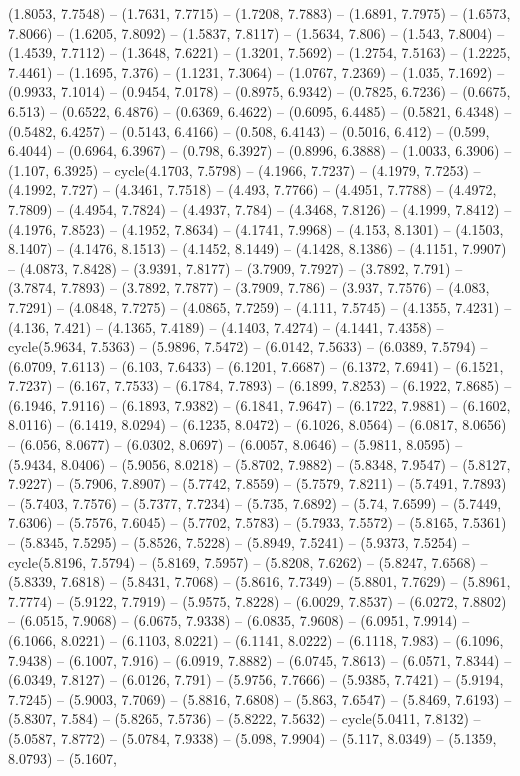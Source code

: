 (1.8053, 7.7548) -- (1.7631, 7.7715) -- (1.7208, 7.7883) -- (1.6891, 7.7975) -- (1.6573, 7.8066) -- (1.6205, 7.8092) -- (1.5837, 7.8117) -- (1.5634, 7.806) -- (1.543, 7.8004) -- (1.4539, 7.7112) -- (1.3648, 7.6221) -- (1.3201, 7.5692) -- (1.2754, 7.5163) -- (1.2225, 7.4461) -- (1.1695, 7.376) -- (1.1231, 7.3064) -- (1.0767, 7.2369) -- (1.035, 7.1692) -- (0.9933, 7.1014) -- (0.9454, 7.0178) -- (0.8975, 6.9342) -- (0.7825, 6.7236) -- (0.6675, 6.513) -- (0.6522, 6.4876) -- (0.6369, 6.4622) -- (0.6095, 6.4485) -- (0.5821, 6.4348) -- (0.5482, 6.4257) -- (0.5143, 6.4166) -- (0.508, 6.4143) -- (0.5016, 6.412) -- (0.599, 6.4044) -- (0.6964, 6.3967) -- (0.798, 6.3927) -- (0.8996, 6.3888) -- (1.0033, 6.3906) -- (1.107, 6.3925) -- cycle(4.1703, 7.5798) -- (4.1966, 7.7237) -- (4.1979, 7.7253) -- (4.1992, 7.727) -- (4.3461, 7.7518) -- (4.493, 7.7766) -- (4.4951, 7.7788) -- (4.4972, 7.7809) -- (4.4954, 7.7824) -- (4.4937, 7.784) -- (4.3468, 7.8126) -- (4.1999, 7.8412) -- (4.1976, 7.8523) -- (4.1952, 7.8634) -- (4.1741, 7.9968) -- (4.153, 8.1301) -- (4.1503, 8.1407) -- (4.1476, 8.1513) -- (4.1452, 8.1449) -- (4.1428, 8.1386) -- (4.1151, 7.9907) -- (4.0873, 7.8428) -- (3.9391, 7.8177) -- (3.7909, 7.7927) -- (3.7892, 7.791) -- (3.7874, 7.7893) -- (3.7892, 7.7877) -- (3.7909, 7.786) -- (3.937, 7.7576) -- (4.083, 7.7291) -- (4.0848, 7.7275) -- (4.0865, 7.7259) -- (4.111, 7.5745) -- (4.1355, 7.4231) -- (4.136, 7.421) -- (4.1365, 7.4189) -- (4.1403, 7.4274) -- (4.1441, 7.4358) -- cycle(5.9634, 7.5363) -- (5.9896, 7.5472) -- (6.0142, 7.5633) -- (6.0389, 7.5794) -- (6.0709, 7.6113) -- (6.103, 7.6433) -- (6.1201, 7.6687) -- (6.1372, 7.6941) -- (6.1521, 7.7237) -- (6.167, 7.7533) -- (6.1784, 7.7893) -- (6.1899, 7.8253) -- (6.1922, 7.8685) -- (6.1946, 7.9116) -- (6.1893, 7.9382) -- (6.1841, 7.9647) -- (6.1722, 7.9881) -- (6.1602, 8.0116) -- (6.1419, 8.0294) -- (6.1235, 8.0472) -- (6.1026, 8.0564) -- (6.0817, 8.0656) -- (6.056, 8.0677) -- (6.0302, 8.0697) -- (6.0057, 8.0646) -- (5.9811, 8.0595) -- (5.9434, 8.0406) -- (5.9056, 8.0218) -- (5.8702, 7.9882) -- (5.8348, 7.9547) -- (5.8127, 7.9227) -- (5.7906, 7.8907) -- (5.7742, 7.8559) -- (5.7579, 7.8211) -- (5.7491, 7.7893) -- (5.7403, 7.7576) -- (5.7377, 7.7234) -- (5.735, 7.6892) -- (5.74, 7.6599) -- (5.7449, 7.6306) -- (5.7576, 7.6045) -- (5.7702, 7.5783) -- (5.7933, 7.5572) -- (5.8165, 7.5361) -- (5.8345, 7.5295) -- (5.8526, 7.5228) -- (5.8949, 7.5241) -- (5.9373, 7.5254) -- cycle(5.8196, 7.5794) -- (5.8169, 7.5957) -- (5.8208, 7.6262) -- (5.8247, 7.6568) -- (5.8339, 7.6818) -- (5.8431, 7.7068) -- (5.8616, 7.7349) -- (5.8801, 7.7629) -- (5.8961, 7.7774) -- (5.9122, 7.7919) -- (5.9575, 7.8228) -- (6.0029, 7.8537) -- (6.0272, 7.8802) -- (6.0515, 7.9068) -- (6.0675, 7.9338) -- (6.0835, 7.9608) -- (6.0951, 7.9914) -- (6.1066, 8.0221) -- (6.1103, 8.0221) -- (6.1141, 8.0222) -- (6.1118, 7.983) -- (6.1096, 7.9438) -- (6.1007, 7.916) -- (6.0919, 7.8882) -- (6.0745, 7.8613) -- (6.0571, 7.8344) -- (6.0349, 7.8127) -- (6.0126, 7.791) -- (5.9756, 7.7666) -- (5.9385, 7.7421) -- (5.9194, 7.7245) -- (5.9003, 7.7069) -- (5.8816, 7.6808) -- (5.863, 7.6547) -- (5.8469, 7.6193) -- (5.8307, 7.584) -- (5.8265, 7.5736) -- (5.8222, 7.5632) -- cycle(5.0411, 7.8132) -- (5.0587, 7.8772) -- (5.0784, 7.9338) -- (5.098, 7.9904) -- (5.117, 8.0349) -- (5.1359, 8.0793) -- (5.1607, 